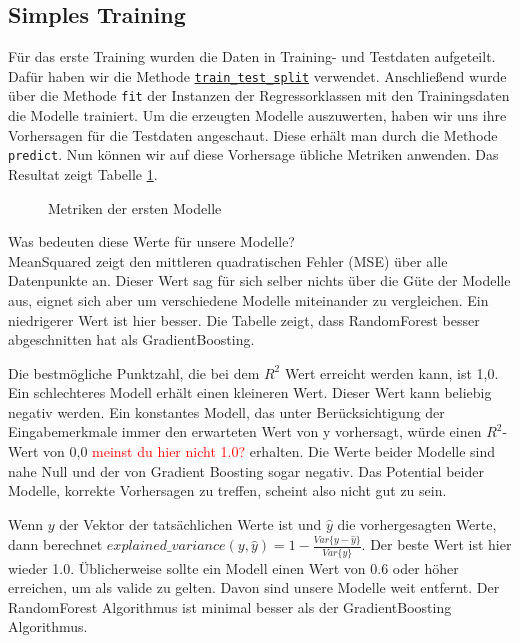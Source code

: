 \documentclass[a4paper,10pt]{scrartcl}
\begin{document}
 \subsection{Simples Training}
 Für das erste Training wurden die Daten in Training- und Testdaten aufgeteilt. Dafür haben wir die Methode \href{https://scikit-learn.org/stable/modules/generated/sklearn.model_selection.train_test_split.html}{\lstinline|train_test_split|} verwendet. Anschließend wurde über die Methode \lstinline|fit| der Instanzen der Regressorklassen mit den Trainingsdaten die Modelle trainiert. Um die erzeugten Modelle auszuwerten, haben wir uns ihre Vorhersagen für die Testdaten angeschaut. Diese erhält man durch die Methode \lstinline|predict|. Nun können wir auf diese Vorhersage übliche Metriken anwenden. Das Resultat zeigt Tabelle \ref{fig:firstresult}.\\
 \begin{figure}[h]
 	\centering
 	\caption{Metriken der ersten Modelle}
 	\label{fig:firstresult}
 \end{figure} 
Was bedeuten diese Werte für unsere Modelle?\\
 MeanSquared zeigt den mittleren quadratischen Fehler (MSE) über alle Datenpunkte an. Dieser Wert sag für sich selber nichts über die Güte der Modelle aus, eignet sich aber um verschiedene Modelle miteinander zu vergleichen. Ein niedrigerer Wert ist hier besser. Die Tabelle zeigt, dass RandomForest besser abgeschnitten hat als GradientBoosting.

Die bestmögliche Punktzahl, die bei dem $R^2$ Wert erreicht werden kann, ist 1,0. Ein schlechteres Modell erhält einen kleineren Wert. Dieser Wert kann beliebig negativ werden. Ein konstantes Modell, das unter Berücksichtigung der Eingabemerkmale immer den erwarteten Wert von y vorhersagt, würde einen $R^2$-Wert von 0,0 \textcolor{red}{meinst du hier nicht 1.0?} erhalten. Die Werte beider Modelle sind nahe Null und der von Gradient Boosting sogar negativ. Das Potential beider Modelle, korrekte Vorhersagen zu treffen, scheint also nicht gut zu sein.

Wenn $y$ der Vektor der tatsächlichen Werte ist und $\hat{y}$ die vorhergesagten Werte, dann berechnet $explained\_{}variance(y, \hat{y}) = 1 - \frac{Var\{ y - \hat{y}\}}{Var\{y\}}$. Der beste Wert ist hier wieder 1.0. Üblicherweise sollte ein Modell einen Wert von 0.6 oder höher erreichen, um als valide zu gelten. Davon sind unsere Modelle weit entfernt. Der RandomForest Algorithmus ist minimal besser als der GradientBoosting Algorithmus. 
\end{document}
